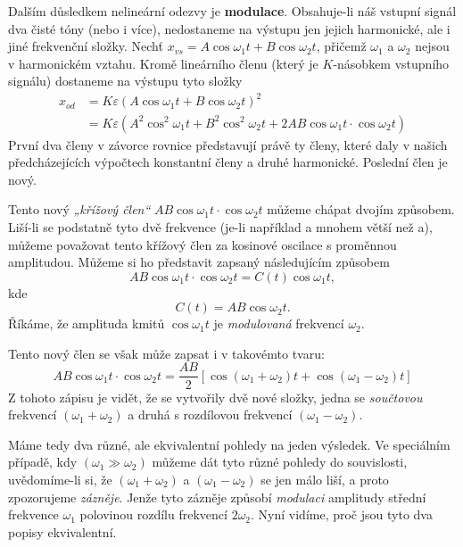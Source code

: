   Dalším důsledkem nelineární odezvy je \textbf{modulace}. Obsa\-huje-li náš vstupní signál dva 
  čisté tóny (nebo i více), nedostaneme na výstupu jen jejich harmonické, ale i jiné frekvenční 
  složky. Nechť \(x_{vs} = A\cos\omega_1 t + B\cos\omega_2 t\), přičemž \(\omega_1\) a \(\omega_2\) 
  nejsou v harmonickém vztahu. Kromě lineárního členu (který je \(K\)-násobkem vstupního signálu) 
  dostaneme na výstupu tyto složky
  \begin{align*}
    x_{od} 
      &= K\varepsilon(A\cos\omega_1 t + B\cos\omega_2 t)^2     \\
      &= K\varepsilon(A^2\cos^2\omega_1 t + B^2\cos^2\omega_2 t 
                                          + 2AB\cos\omega_1 t \cdot\cos\omega_2 t )
  \end{align*}
  První dva členy v závorce rovnice představují právě ty členy, které daly v našich předcházejících 
  výpočtech konstantní členy a druhé harmonické. Poslední člen je nový.
  
  Tento nový \emph{„křížový člen“} \(AB\cos\omega_1 t\cdot\cos\omega_2 t\) můžeme chápat dvojím 
  způsobem. Liší-li se podstatně tyto dvě frekvence (je-li například a mnohem větší než a), můžeme 
  považovat tento křížový člen za kosinové oscilace s proměnnou amplitudou. Můžeme si ho představit 
  zapsaný následujícím způsobem
  \begin{equation*}
    AB\cos\omega_1 t\cdot\cos\omega_2 t = C(t)\cos\omega_1 t,
  \end{equation*}
  kde
  \begin{equation*}
    C(t) = AB\cos\omega_2 t.
  \end{equation*}
  Říkáme, že amplituda kmitů \(\cos\omega_1t\) je \emph{modulovaná} frekvencí \(\omega_2\). 
  
  Tento nový člen se však může zapsat i v takovémto tvaru:
  \begin{equation*}
    AB\cos\omega_1 t\cdot\cos\omega_2 t 
     = \frac{AB}{2}[\cos(\omega_1 + \omega_2)t + \cos(\omega_1 - \omega_2)t ]
  \end{equation*}
  Z tohoto zápisu je vidět, že se vytvořily dvě nové složky, jedna se \emph{součtovou} frekvencí 
  \((\omega_1 + \omega_2)\) a druhá s rozdílovou frekvencí \((\omega_1 - \omega_2)\). 
  
  Máme tedy dva různé, ale ekvivalentní pohledy na jeden výsledek. Ve speciálním případě, kdy 
  \((\omega_1 \gg \omega_2)\) můžeme dát tyto různé pohledy do souvislosti, uvědomíme-li si, že 
  \((\omega_1 + \omega_2)\)  a \((\omega_1 - \omega_2)\)  se jen málo liší, a proto zpozorujeme 
  \emph{zázněje}. Jenže tyto zázněje způsobí \emph{modulaci} amplitudy střední frekvence 
  \(\omega_1\) polovinou rozdílu frekvencí \(2\omega_2\). Nyní vidíme, proč jsou tyto dva popisy 
  ekvivalentní.
  
